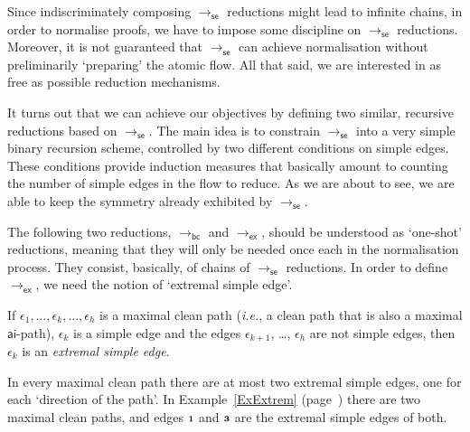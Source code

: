 \documentclass[a4paper]{LMCS}
\begin{document}
Since indiscriminately composing $\to_{{\mathsf{se}}}$ reductions might lead to infinite chains, in order to normalise proofs, we have to impose some discipline on $\to_{{\mathsf{se}}}$ reductions. Moreover, it is not guaranteed that $\to_{{\mathsf{se}}}$ can achieve normalisation without preliminarily `preparing' the atomic flow. All that said, we are interested in as free as possible reduction mechanisms.

It turns out that we can achieve our objectives by defining two similar, recursive reductions based on $\to_{{\mathsf{se}}}$. The main idea is to constrain $\to_{{\mathsf{se}}}$ into a very simple binary recursion scheme, controlled by two different conditions on simple edges. These conditions provide induction measures that basically amount to counting the number of simple edges in the flow to reduce. As we are about to see, we are able to keep the symmetry already exhibited by $\to_{{\mathsf{se}}}$.

The following two reductions, $\to_{{\mathsf{bc}}}$ and $\to_{{\mathsf{ex}}}$, should be understood as `one-shot' reductions, meaning that they will only be needed once each in the normalisation process. They consist, basically, of chains of $\to_{{\mathsf{se}}}$ reductions. In order to define $\to_{{\mathsf{ex}}}$, we need the notion of `extremal simple edge'.

\begin{defi}
If $\epsilon_1,\dots,\epsilon_k,\dots,\epsilon_h$ is a maximal clean path (\emph{i.e.}, a clean path that is also a maximal ${\mathsf{ai}}$-path), $\epsilon_k$ is a simple edge and the edges $\epsilon_{k+1}$, \dots, $\epsilon_h$ are not simple edges, then $\epsilon_k$ is an \emph{extremal simple edge}.
\end{defi}

\begin{rem}
In every maximal clean path there are at most two extremal simple edges, one for each `direction of the path'. In Example~\ref{ExExtrem} (page~\pageref{ExExtrem}) there are two maximal clean paths, and edges ${{\mathchoice{\scriptstyle\mathbf1}
                              {\scriptstyle\mathbf1}
                              {\scriptstyle\mathbf1}
                              {\scriptscriptstyle\mathbf1}}}$ and ${{\mathchoice{\scriptstyle\mathbf3}
                                {\scriptstyle\mathbf3}
                                {\scriptstyle\mathbf3}
                                {\scriptscriptstyle\mathbf3}}}$ are the extremal simple edges of both.
\end{rem}
\end{document}
